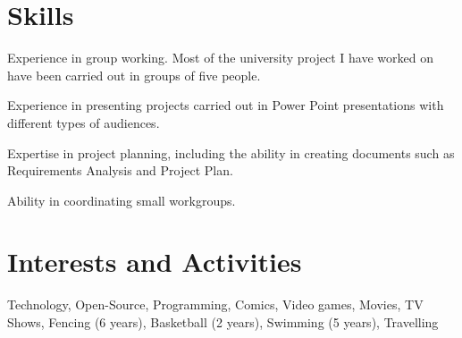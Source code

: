 \documentclass[a4paper,10pt]{article} %
\begin{document}

\section{Skills}

\begin{compactitem}
  
  \item Experience in group working. Most of the university project I have worked on have been carried out in groups of five people.\\
  \item Experience in presenting projects carried out in Power Point presentations with different types of audiences.\\
  \item Expertise in project planning, including the ability in creating documents such as Requirements Analysis and Project Plan.\\
  \item Ability in coordinating small workgroups.\\
  
\end{compactitem}


\section{Interests and Activities}

Technology, Open-Source, Programming, Comics, Video games, Movies, TV Shows, Fencing (6 years), Basketball (2 years), Swimming (5 years), Travelling





\end{document}
